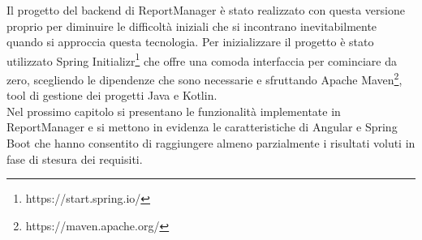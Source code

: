 Il progetto del backend di ReportManager è stato realizzato con questa versione proprio per diminuire le difficoltà iniziali che si incontrano inevitabilmente
quando si approccia questa tecnologia.
Per inizializzare il progetto è stato utilizzato Spring Initializr\footnote{https://start.spring.io/} che offre una comoda interfaccia per cominciare da zero,
scegliendo le dipendenze che sono necessarie e sfruttando Apache Maven\footnote{https://maven.apache.org/}, tool di gestione dei progetti Java e Kotlin.
\\
Nel prossimo capitolo si presentano le funzionalità implementate in ReportManager e si mettono in evidenza le caratteristiche di Angular e Spring Boot che hanno consentito 
di raggiungere almeno parzialmente i risultati voluti in fase di stesura dei requisiti.
